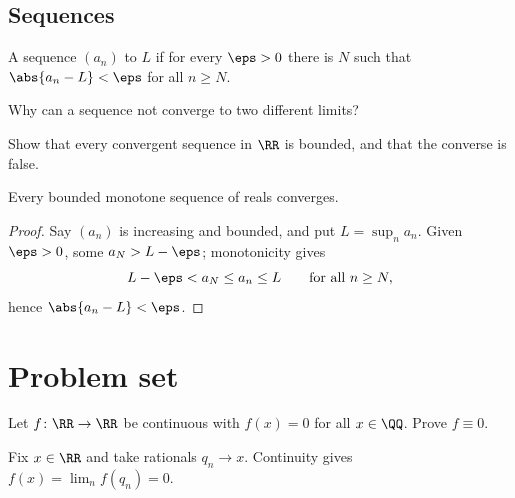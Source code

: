 \documentclass[11pt]{article}
\begin{document}
\subsection{Sequences}

\begin{definition}
  A sequence $(a_n)$  to $L$ if for every $\eps > 0$
  there is $N$ such that $\abs{a_n - L} < \eps$ for all $n \ge N$.
\end{definition}

\begin{ques}
  Why can a sequence not converge to two different limits?
\end{ques}

\begin{exercise}
  Show that every convergent sequence in $\RR$ is bounded, and that the
  converse is false.
\end{exercise}

\begin{proposition}
  Every bounded monotone sequence of reals converges.
\end{proposition}

\begin{proof}
  Say $(a_n)$ is increasing and bounded, and put $L = \sup_n a_n$.
  Given $\eps > 0$, some $a_N > L - \eps$; monotonicity gives
  \[ L - \eps < a_N \le a_n \le L \qquad \text{for all } n \ge N, \]
  hence $\abs{a_n - L} < \eps$.
\end{proof}

\section{Problem set}

\begin{problem}
  Let $f \colon \RR \to \RR$ be continuous with $f(x) = 0$ for all
  $x \in \QQ$. Prove $f \equiv 0$.
\end{problem}

\begin{soln}
  Fix $x \in \RR$ and take rationals $q_n \to x$. Continuity gives
  $f(x) = \lim_n f(q_n) = 0$.
\end{soln}
\end{document}
